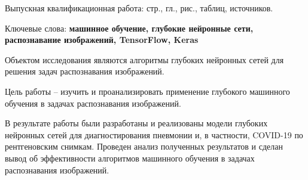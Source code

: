 
Выпускная квалификационная работа: \pageref{LastPage} стр., 
 гл., 
\totalfigures{} рис.,
\totaltables{} таблиц,
 источников.

Ключевые слова: \textbf{машинное обучение, глубокие нейронные сети, распознавание изображений, TensorFlow, Keras}

Объектом исследования являются алгоритмы глубоких нейронных сетей для решения задач распознавания изображений. 

Цель работы – изучить и проанализировать применение глубокого машинного обучения в задачах распознавания изображений.

В результате работы были разработаны и реализованы модели глубоких нейронных сетей для диагностирования пневмонии и, в частности, COVID-19 по рентгеновским снимкам. Проведен анализ полученных результатов и сделан вывод об эффективности алгоритмов машинного обучения в задачах распознавания изображений.

\clearpage